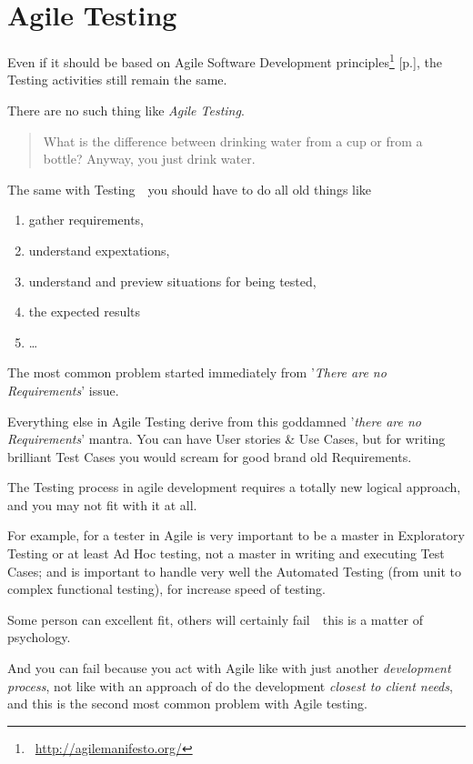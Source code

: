 \section{Agile Testing}
\label{sec:Agile Testing}

Even if it should be based on Agile Software Development principles\footnote{~\url{http://agilemanifesto.org/}} [p.\pageref{sec:Agile Software Development}], the Testing activities still remain the same.

There are no such thing like \emph{Agile Testing}.

\begin{quote}
What is the difference between drinking water from a cup or from a bottle? Anyway, you just drink water.
\end{quote}

The same with Testing~\textemdash~you should have to do all old things like 

\begin{enumerate}
 \item 
 gather requirements,
 \item 
 understand expextations,
  \item 
 understand and preview situations for being tested,
  \item 
 the expected results
  \item 
  …
 \end{enumerate}

The most common problem started immediately from '\emph{There are no Requirements}' issue.

Everything else in Agile Testing derive from this goddamned '\emph{there are no Requirements}' mantra. You can have User stories \& Use Cases, but for writing brilliant Test Cases you would scream for good brand old Requirements.

The Testing process in agile development requires a totally new logical approach, and you may not fit with it at all.

For example, for a tester in Agile is very important to be a master in Exploratory Testing or at least Ad Hoc testing, not a master in writing and executing Test Cases; and is important to handle very well the Automated Testing (from unit to complex functional testing), for increase speed of testing.

Some person can excellent fit, others will certainly fail~\textemdash~this is a matter of psychology.

And you can fail because you act with Agile like with just another \emph{development process}, not like with an approach of do the development \emph{closest to client needs}, and this is the second most common problem with Agile testing. 
